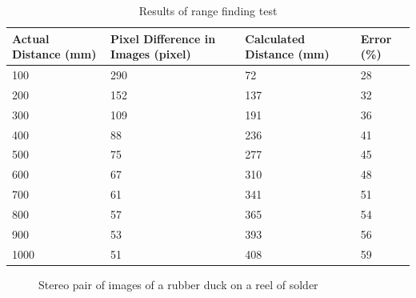 \begin{table}
\centering
\caption{Results of range finding test}
\label{table:range}
\begin{tabular}{p{3cm}p{3cm}p{3cm}p{3cm}} \toprule
Actual Distance (mm) & Pixel Difference in Images (pixel) & Calculated Distance (mm) & Error (\%) \\ \toprule
100 & 290 & 72 & 28\\ \midrule
200 & 152 & 137 & 32\\ \midrule
300 & 109 & 191 & 36\\ \midrule
400 & 88 & 236 & 41\\ \midrule
500 & 75 & 277 & 45\\ \midrule
600 & 67 & 310 & 48\\ \midrule
700 & 61 & 341 & 51\\ \midrule
800 & 57 & 365 & 54\\ \midrule
900 & 53 & 393 & 56\\ \midrule
1000 & 51 & 408 & 59\\ \bottomrule
\end{tabular}
\end{table}
\begin{figure}
\centering
{}
\caption{Stereo pair of images of a rubber duck on a reel of solder}
\label{fig:duck:stereo}
\end{figure}



